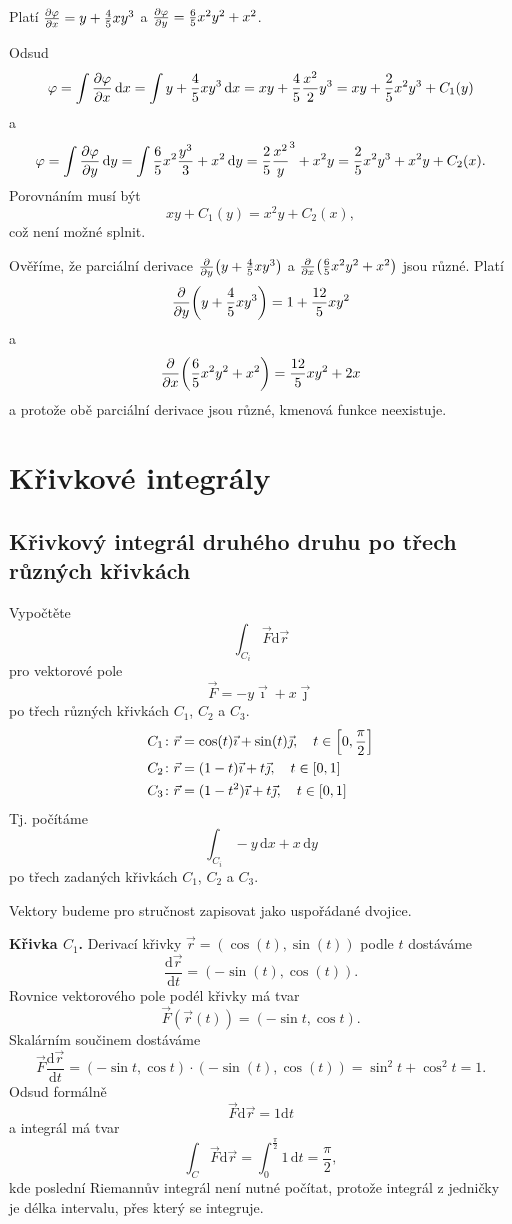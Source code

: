 \reseni

Platí $\pdv {\varphi}{x}=y+\frac 45 xy^3$ a $\pdv{\varphi}{y}=\frac 65 x^2y^2+x^2$.

Odsud
$$\varphi =\int \pdv{\varphi}{x} \,\mathrm dx=\int y+\frac 45 xy^3 \,\mathrm dx
=xy+\frac 45 \frac {x^2}{2}y^3=xy+\frac 25 x^2y^3+C_1(y)$$
a
$$\varphi =\int \pdv{\varphi}{y} \,\mathrm dy=\int \frac 65 x^2\frac{y^3}{3} +x^2 \,\mathrm dy
=\frac 25 \frac {x^2}y^3+x^2y=\frac 25 x^2y^3+x^2y+ C_2(x).$$
Porovnáním musí být
$$xy+C_1(y)=x^2y+C_2(x),$$
což není možné splnit.

Ověříme, že parciální derivace
$\pdv {y} \qty(y+\frac 45 xy^3)$ a $\pdv{x}\qty(\frac 65 x^2y^2+x^2)$ jsou různé.
Platí
$$\pdv {y} \qty(y+\frac 45 xy^3)=1+\frac{12}5xy^2$$
a
$$\pdv{x}\qty(\frac 65 x^2y^2+x^2)=\frac {12}5 xy^2+2x$$
a protože obě parciální derivace jsou různé, kmenová funkce neexistuje.

\konec



\section{Křivkové integrály}

\nonstopmode

\subsection{Křivkový integrál druhého druhu po třech různých křivkách}


Vypočtěte $$\int_{C_i} \vec F \mathrm d\vec r$$ pro vektorové pole $$\vec F=-y\vec \imath + x\vec\jmath$$ po třech různých křivkách $C_1$, $C_2$ a $C_3$.
\begin{align*}
  C_1&\colon \vec r=\cos(t)\vec \imath + \sin (t)\vec\jmath, \quad t\in\qty[0,\frac\pi 2]\\
  C_2&\colon \vec r=(1-t)\vec \imath + t\vec\jmath, \quad t\in\qty[0,1]\\
  C_3&\colon \vec r=(1-t^2)\vec \imath + t\vec\jmath, \quad t\in\qty[0,1]
\end{align*}
Tj. počítáme
$$\int_{C_i} -y\,\mathrm dx + x\,\mathrm dy$$
po třech zadaných křivkách $C_1$, $C_2$ a $C_3$.

\reseni

Vektory budeme pro stručnost zapisovat jako uspořádané dvojice.

\stranka

\textbf{Křivka $C_1$.}
Derivací křivky $\vec r=(\cos(t),\sin(t))$ podle $t$ dostáváme
$$\frac{\mathrm d\vec r}{\mathrm dt}=(-\sin (t),\cos (t)).$$
Rovnice vektorového pole podél křivky má tvar
$$\vec F(\vec r(t))=(-\sin t,\cos t).$$
Skalárním součinem dostáváme
$$\vec F \frac{\mathrm d\vec r}{\mathrm dt}=
(-\sin t,\cos t)\cdot (-\sin (t),\cos (t)) = \sin^2 t+\cos^2 t =1.
$$
Odsud formálně $$\vec F\mathrm d\vec r=1\mathrm dt$$
a integrál má tvar
$$\int_C\vec F\mathrm d\vec r=\int_0^{\frac \pi 2}1\,\mathrm dt=\frac \pi 2,$$
kde poslední Riemannův integrál není nutné počítat, protože integrál z jedničky je délka intervalu, přes který se integruje.

